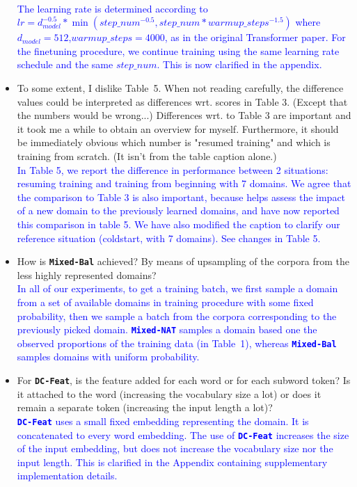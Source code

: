 \documentclass[12pt,times,a4paper,twoside]{article}
\newcommand{\fyDone}[1]{\done[FY]\Todo[FY:]{\textcolor{orange}{#1}}}
\theoremstyle{definition}
\newcommand{\system}[1]{\texttt{\textbf{#1}}}
\begin{document}
\begin{itemize}
\\
\textcolor{blue}{The learning rate is determined according to $lr = d_{model}^{-0.5}*\min(step\_num^{-0.5},step\_num * warmup\_steps^{-1.5})$ where $d_{model}=512$,$warmup\_steps=4000$, as in the original Transformer paper. For the finetuning procedure, we continue training using the same learning rate schedule and the same $step\_num$. This is now clarified in the appendix.}\fyDone{Fix this, add comments in appendix}
\\
\item To some extent, I dislike Table~5. When not reading carefully, the difference values could be interpreted as differences wrt. scores in Table 3. (Except that the numbers would be wrong...) Differences wrt. to Table 3 are important and it took me a while to obtain an overview for myself. Furthermore, it should be immediately obvious which number is "resumed training" and which is training from scratch. (It isn't from the table caption alone.)
\\
\textcolor{blue}{In Table 5, we report the difference in performance between 2 situations: resuming training and training from beginning with 7 domains. We agree that the comparison to Table 3 is also important, because helps assess the impact of a new domain to the previously learned domains, and have now reported this comparison in table 5. We have also modified the caption to clarify our reference situation (coldstart, with 7 domains). See changes in Table 5.}\fyDone{What should we do about it ?}
\\
\item How is \system{Mixed-Bal} achieved? By means of upsampling of the corpora from the less highly represented domains?
\\
\textcolor{blue}{In all of our experiments, to get a training batch, we first sample a domain from a set of available domains in training procedure with some fixed probability, then we sample a batch from the corpora corresponding to the previously picked domain. \system{Mixed-NAT} samples a domain based one the observed proportions of the training data (in Table~1), whereas \system{Mixed-Bal} samples domains with uniform probability.}
\\
\item For \system{DC-Feat}, is the feature added for each word or for each subword token? Is it attached to the word (increasing the vocabulary size a lot) or does it remain a separate token (increasing the input length a lot)?
\\
\textcolor{blue}{\system{DC-Feat} uses a small fixed embedding representing the domain. It is concatenated to every word embedding. The use of \system{DC-Feat} increases the size of the input embedding, but does not increase the vocabulary size nor the input length. This is clarified in the Appendix containing supplementary implementation details.}

\end{itemize}
\end{document}
